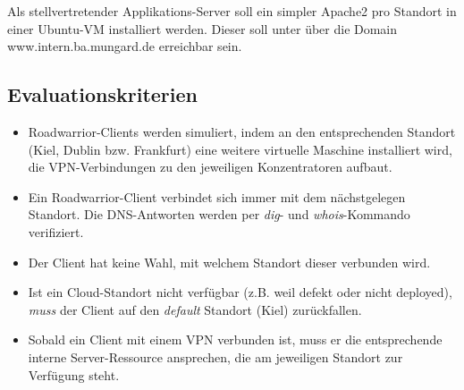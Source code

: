 Als stellvertretender \glqq Applikations-Server\grqq{} soll ein simpler Apache2 pro Standort in einer Ubuntu-VM installiert werden. Dieser soll unter über die Domain www.intern.ba.mungard.de erreichbar sein.
%
\subsection{Evaluationskriterien}
\begin{itemize}
\item Roadwarrior-Clients werden simuliert, indem an den entsprechenden Standort (Kiel, Dublin bzw. Frankfurt) eine weitere virtuelle Maschine installiert wird, die VPN-Verbindungen zu den jeweiligen Konzentratoren aufbaut.
\item Ein Roadwarrior-Client verbindet sich immer mit dem nächstgelegen Standort. Die DNS-Antworten werden per \textit{dig}- und \textit{whois}-Kommando verifiziert.
\item Der Client hat keine Wahl, mit welchem Standort dieser verbunden wird.
\item Ist ein Cloud-Standort nicht verfügbar (z.B. weil defekt oder nicht deployed), \textit{muss} der Client auf den \textit{default} Standort (Kiel) zurückfallen.
\item Sobald ein Client mit einem VPN verbunden ist, muss er die entsprechende interne Server-Ressource ansprechen, die am jeweiligen Standort zur Verfügung steht.
\end{itemize}
